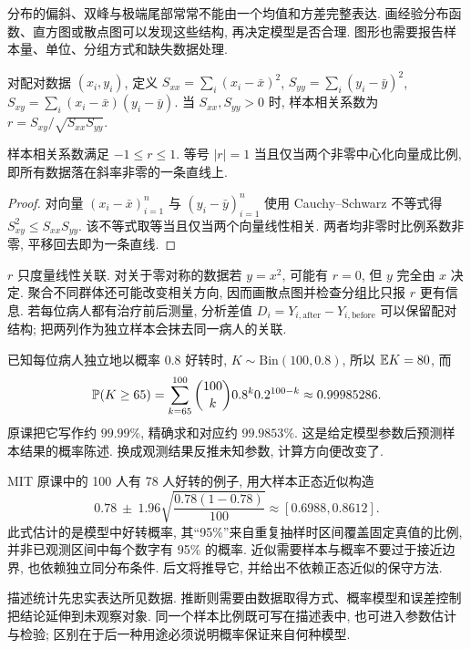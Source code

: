 分布的偏斜、双峰与极端尾部常常不能由一个均值和方差完整表达. 画经验分布函数、直方图或散点图可以发现这些结构, 再决定模型是否合理. 图形也需要报告样本量、单位、分组方式和缺失数据处理.

对配对数据 $(x_i,y_i)$, 定义 $S_{xx}=\sum_i(x_i-\bar x)^2$, $S_{yy}=\sum_i(y_i-\bar y)^2$, $S_{xy}=\sum_i(x_i-\bar x)(y_i-\bar y)$. 当 $S_{xx},S_{yy}>0$ 时, 样本相关系数为 $r=S_{xy}/\sqrt{S_{xx}S_{yy}}$.

\begin{proposition}
样本相关系数满足 $-1\le r\le1$. 等号 $|r|=1$ 当且仅当两个非零中心化向量成比例, 即所有数据落在斜率非零的一条直线上.
\end{proposition}
\begin{proof}
对向量 $(x_i-\bar x)_{i=1}^n$ 与 $(y_i-\bar y)_{i=1}^n$ 使用 Cauchy--Schwarz 不等式得 $S_{xy}^2\le S_{xx}S_{yy}$. 该不等式取等当且仅当两个向量线性相关. 两者均非零时比例系数非零, 平移回去即为一条直线.
\end{proof}
$r$ 只度量线性关联. 对关于零对称的数据若 $y=x^2$, 可能有 $r=0$, 但 $y$ 完全由 $x$ 决定. 聚合不同群体还可能改变相关方向, 因而画散点图并检查分组比只报 $r$ 更有信息. 若每位病人都有治疗前后测量, 分析差值 $D_i=Y_{i,\mathrm{after}}-Y_{i,\mathrm{before}}$ 可以保留配对结构; 把两列作为独立样本会抹去同一病人的关联.

已知每位病人独立地以概率 $0.8$ 好转时, $K\sim\mathrm{Bin}(100,0.8)$, 所以 $\mathbb E K=80$, 而
\[
 \mathbb P(K\ge65)=\sum_{k=65}^{100}\binom{100}{k}0.8^k0.2^{100-k}
 \approx0.99985286.
\]
原课把它写作约 $99.99\%$, 精确求和对应约 $99.9853\%$. 这是给定模型参数后预测样本结果的概率陈述. 换成观测结果反推未知参数, 计算方向便改变了.

MIT 原课中的 100 人有 78 人好转的例子, 用大样本正态近似构造
\[
 0.78\ \pm\ 1.96\sqrt{\frac{0.78(1-0.78)}{100}}
 \approx[0.6988,0.8612].
\]
此式估计的是模型中好转概率, 其“95\%”来自重复抽样时区间覆盖固定真值的比例, 并非已观测区间中每个数字有 95\% 的概率. 近似需要样本与概率不要过于接近边界, 也依赖独立同分布条件. 后文将推导它, 并给出不依赖正态近似的保守方法.

描述统计先忠实表达所见数据. 推断则需要由数据取得方式、概率模型和误差控制把结论延伸到未观察对象. 同一个样本比例既可写在描述表中, 也可进入参数估计与检验; 区别在于后一种用途必须说明概率保证来自何种模型.
